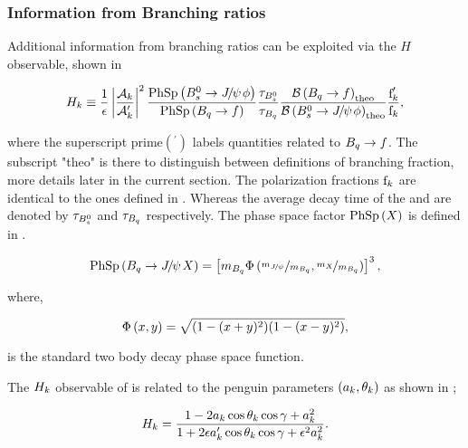 \subsubsection{Information from Branching ratios}
Additional information from branching ratios can be exploited via the $H$ observable\cite{Fleischer:1999zi}, shown in 

\begin{equation}
\centering
  \Hobs{k} \equiv   \frac{1}{\epsilon}
            \modulo{\frac{\formFctr{k}}{\formFctr{k}'}}^2
                    \frac{\PhSp{\BsJpsiPhi}} {\PhSp{\Bq\to f}}
                    \frac{\tau_{\Bs}}{\tau_{\Bq}}
                    \frac{\BRof{\Bq\to f}_{\rm theo}}{\BRof{\BsJpsiPhi}_{\rm theo}}
                    \frac{\fP{k}'}{{\fP{k}}},
\label{hobs_def}
\end{equation}

\noindent where the superscript prime$({}^\prime)$ labels quantities related to $B_q\rightarrow f$. The subscript "theo" is there
to distinguish between definitions of branching fraction, more details later in the current section.
The polarization fractions $\text{f}_{k}$ are identical to the ones defined in .
Whereas the average decay time of the \Bs and \Bq are denoted by $\tau_{B^0_s}$ and $\tau_{B_q}$
respectively. The phase space factor ${\rm PhSp}\left( X \right)$ is defined in .

\begin{equation}
\centering
   \PhSp{\BJpsiX}  = \brackets{ \mass{\Bq} \PhSpPhi{ \nicefrac{\mass{\jpsi}}{\mass{\Bq}}, \nicefrac{\mass{X}}{\mass{\Bq}}  } }^3,
\label{phase_space_eq_def}
\end{equation}

\noindent where,

\begin{equation}
\centering
   \PhSpPhi{x,y} = \sqrt{ (1-(x+y)^2)(1-(x-y)^2) },
\label{phase_space_phi_eq_def}
\end{equation}

\noindent is the standard two body decay phase space function.

The $H_{k}$ observable of  is related\cite{Fleischer:1999zi}
to the penguin parameters $(a_k,\theta_k)$ as shown in ;

\begin{equation}
\centering
  \Hobs{k} = \frac{1-2\akPeng\cos\thkPeng\cos\gamma + \akPeng^2}{1+2\epsilon\akPengPrime\cos\thkPeng\cos\gamma + \epsilon^2\akPeng^2}.
\label{Hobs_peng_param}
\end{equation}

